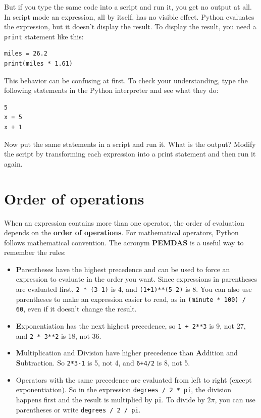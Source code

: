 \documentclass[10pt]{book}
\begin{document}
But if you type the same code into a script and run it, you get no
output at all.
In script mode an expression, all by itself, has no
visible effect.  Python evaluates the expression, but it doesn't
display the result.
To display the result, you need a {\tt print} statement like this:

\begin{verbatim}
miles = 26.2
print(miles * 1.61)
\end{verbatim}

This behavior can be confusing at first.
To check your understanding, type the following statements in the
Python interpreter and see what they do:

\begin{verbatim}
5
x = 5
x + 1
\end{verbatim}

Now put the same statements in a script and run it.  What
is the output?  Modify the script by transforming each
expression into a print statement and then run it again.


\section{Order of operations}

When an expression contains more than one operator, the order of
evaluation depends on the {\bf order of operations}.  For
mathematical operators, Python follows mathematical convention.
The acronym {\bf PEMDAS} is a useful way to
remember the rules:

\begin{itemize}

\item {\bf P}arentheses have the highest precedence and can be used
to force an expression to evaluate in the order you want. Since
expressions in parentheses are evaluated first, {\tt 2 * (3-1)} is 4,
and {\tt (1+1)**(5-2)} is 8. You can also use parentheses to make an
expression easier to read, as in {\tt (minute * 100) / 60}, even
if it doesn't change the result.

\item {\bf E}xponentiation has the next highest precedence, so
{\tt 1 + 2**3} is 9, not 27, and {\tt 2 * 3**2} is 18, not 36.

\item {\bf M}ultiplication and {\bf D}ivision have higher precedence
  than {\bf A}ddition and {\bf S}ubtraction.  So {\tt 2*3-1} is 5, not
  4, and {\tt 6+4/2} is 8, not 5.

\item Operators with the same precedence are evaluated from left to
  right (except exponentiation).  So in the expression {\tt degrees /
    2 * pi}, the division happens first and the result is multiplied
  by {\tt pi}.  To divide by $2 \pi$, you can use parentheses or write
  {\tt degrees / 2 / pi}.

\end{itemize}
\end{document}
